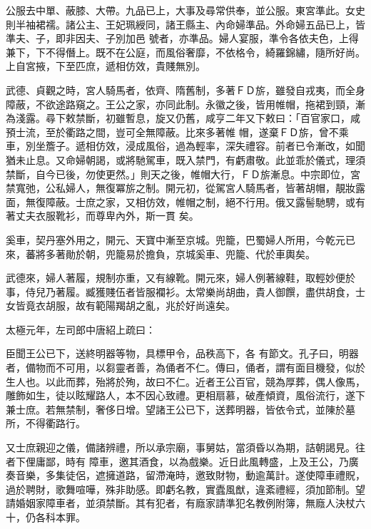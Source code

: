 \begin{pinyinscope}
 公服去中單、蔽膝、大帶。九品已上，大事及尋常供奉，並公服。東宮準此。女史則半袖裙襦。諸公主、王妃珮綬同，諸王縣主、內命婦準品。外命婦五品已上，皆準夫、子，即非因夫、子別加邑
 號者，亦準品。婦人宴服，準令各依夫色，上得兼下，下不得僭上。既不在公庭，而風俗奢靡，不依格令，綺羅錦繡，隨所好尚。上自宮掖，下至匹庶，遞相仿效，貴賤無別。



 武德、貞觀之時，宮人騎馬者，依齊、隋舊制，多著ＦＤ旂，雖發自戎夷，而全身障蔽，不欲途路窺之。王公之家，亦同此制。永徽之後，皆用帷帽，拖裙到頸，漸為淺露。尋下敕禁斷，初雖暫息，旋又仍舊，咸亨二年又下敕曰：「百官家口，咸預士流，至於衢路之間，豈可全無障蔽。比來多著帷
 帽，遂棄ＦＤ旂，曾不乘車，別坐簷子。遞相仿效，浸成風俗，過為輕率，深失禮容。前者已令漸改，如聞猶未止息。又命婦朝謁，或將馳駕車，既入禁門，有虧肅敬。此並乖於儀式，理須禁斷，自今已後，勿使更然。」則天之後，帷帽大行，ＦＤ旂漸息。中宗即位，宮禁寬弛，公私婦人，無復冪旂之制。開元初，從駕宮人騎馬者，皆著胡帽，靚妝露面，無復障蔽。士庶之家，又相仿效，帷帽之制，絕不行用。俄又露髻馳騁，或有著丈夫衣服靴衫，而尊卑內外，斯一貫
 矣。



 奚車，契丹塞外用之，開元、天寶中漸至京城。兜籠，巴蜀婦人所用，今乾元已來，蕃將多著勛於朝，兜籠易於擔負，京城奚車、兜籠、代於車輿矣。



 武德來，婦人著履，規制亦重，又有線靴。開元來，婦人例著線鞋，取輕妙便於事，侍兒乃著履。臧獲賤伍者皆服襴衫。太常樂尚胡曲，貴人御饌，盡供胡食，士女皆竟衣胡服，故有範陽羯胡之亂，兆於好尚遠矣。



 太極元年，左司郎中唐紹上疏曰：



 臣聞王公已下，送終明器等物，具標甲令，品秩高下，各
 有節文。孔子曰，明器者，備物而不可用，以芻靈者善，為俑者不仁。傳曰，俑者，謂有面目機發，似於生人也。以此而葬，殆將於殉，故曰不仁。近者王公百官，競為厚葬，偶人像馬，雕飾如生，徒以眩耀路人，本不因心致禮。更相扇慕，破產傾資，風俗流行，遂下兼士庶。若無禁制，奢侈日增。望諸王公已下，送葬明器，皆依令式，並陳於墓所，不得衢路行。



 又士庶親迎之儀，備諸辨禮，所以承宗廟，事舅姑，當須昏以為期，詰朝謁見。往者下俚庸鄙，時有
 障車，邀其酒食，以為戲樂。近日此風轉盛，上及王公，乃廣奏音樂，多集徒侶，遮擁道路，留滯淹時，邀致財物，動逾萬計。遂使障車禮貺，過於聘財，歌舞喧嘩，殊非助感。即虧名教，實蠹風猷，違紊禮經，須加節制。望請婚姻家障車者，並須禁斷。其有犯者，有廕家請準犯名教例附簿，無廕人決杖六十，仍各科本罪。



\end{pinyinscope}